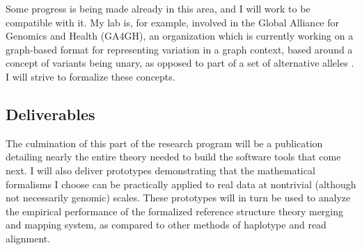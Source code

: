 \documentclass[11pt,proposal]{ucthesis}
\begin{document}
Some progress is being made already in this area, and I will work to be compatible with it. My lab is, for example, involved in the Global Alliance for Genomics and Health (GA4GH), an organization which is currently working on a graph-based format for representing variation in a graph context, based around a concept of variants being unary, as opposed to part of a set of alternative alleles \cite{ga4gh2014variation}. I will strive to formalize these concepts.

\subsection{Deliverables}

The culmination of this part of the research program will be a publication detailing nearly the entire theory needed to build the software tools that come next. I will also deliver prototypes demonstrating that the mathematical formalisms I choose can be practically applied to real data at nontrivial (although not necessarily genomic) scales. These prototypes will in turn be used to analyze the empirical performance of the formalized reference structure theory merging and mapping system, as compared to other methods of haplotype and read alignment.


    
    
    
        
        
        
        
        
    
    
        
\end{document}
